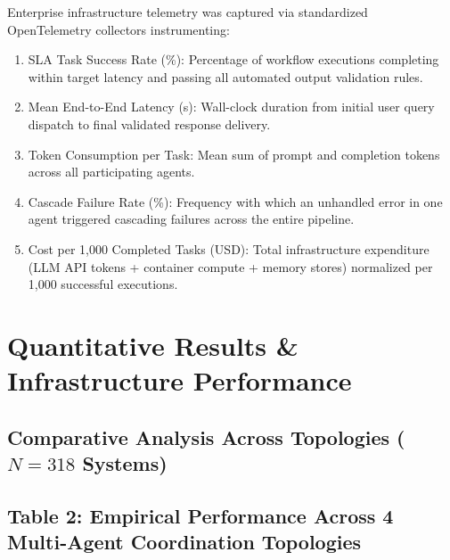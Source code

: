 \documentclass[10pt,twocolumn,letterpaper]{article}
\begin{document}
Enterprise infrastructure telemetry was captured via standardized OpenTelemetry collectors instrumenting:
\begin{enumerate}
  \item SLA Task Success Rate (\%): Percentage of workflow executions completing within target latency and passing all automated output validation rules.
  \item Mean End-to-End Latency (s): Wall-clock duration from initial user query dispatch to final validated response delivery.
  \item Token Consumption per Task: Mean sum of prompt and completion tokens across all participating agents.
  \item Cascade Failure Rate (\%): Frequency with which an unhandled error in one agent triggered cascading failures across the entire pipeline.
  \item Cost per 1,000 Completed Tasks (USD): Total infrastructure expenditure (LLM API tokens + container compute + memory stores) normalized per 1,000 successful executions.
\end{enumerate}




\section{Quantitative Results \& Infrastructure Performance}



\subsection{Comparative Analysis Across Topologies ($N = 318$ Systems)}



\subsection{Table 2: Empirical Performance Across 4 Multi-Agent Coordination Topologies}
\begin{table}[htbp]
\centering
{}
\end{table}
\end{document}
